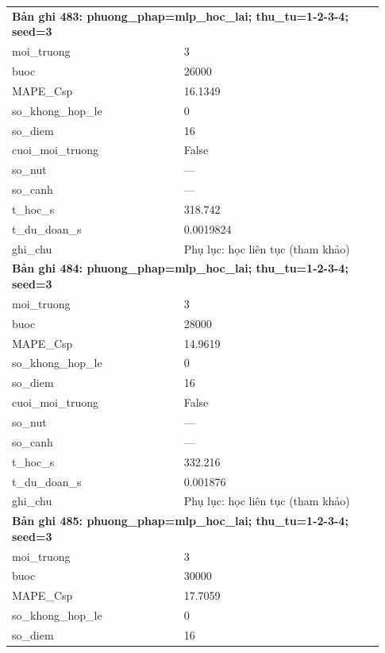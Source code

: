 \begin{longtable}{p{0.43\linewidth}p{0.50\linewidth}}
\midrule
\multicolumn{2}{p{0.95\linewidth}}{\textbf{Bản ghi 483: phuong\_phap=mlp\_hoc\_lai; thu\_tu=1-2-3-4; seed=3}} \\
moi\_\allowbreak truong & 3 \\
buoc & 26000 \\
MAPE\_\allowbreak Csp & 16.1349 \\
so\_\allowbreak khong\_\allowbreak hop\_\allowbreak le & 0 \\
so\_\allowbreak diem & 16 \\
cuoi\_\allowbreak moi\_\allowbreak truong & False \\
so\_\allowbreak nut & — \\
so\_\allowbreak canh & — \\
t\_\allowbreak hoc\_\allowbreak s & 318.742 \\
t\_\allowbreak du\_\allowbreak doan\_\allowbreak s & 0.0019824 \\
ghi\_\allowbreak chu & Phụ lục: học liên tục (tham khảo) \\
\midrule
\multicolumn{2}{p{0.95\linewidth}}{\textbf{Bản ghi 484: phuong\_phap=mlp\_hoc\_lai; thu\_tu=1-2-3-4; seed=3}} \\
moi\_\allowbreak truong & 3 \\
buoc & 28000 \\
MAPE\_\allowbreak Csp & 14.9619 \\
so\_\allowbreak khong\_\allowbreak hop\_\allowbreak le & 0 \\
so\_\allowbreak diem & 16 \\
cuoi\_\allowbreak moi\_\allowbreak truong & False \\
so\_\allowbreak nut & — \\
so\_\allowbreak canh & — \\
t\_\allowbreak hoc\_\allowbreak s & 332.216 \\
t\_\allowbreak du\_\allowbreak doan\_\allowbreak s & 0.001876 \\
ghi\_\allowbreak chu & Phụ lục: học liên tục (tham khảo) \\
\midrule
\multicolumn{2}{p{0.95\linewidth}}{\textbf{Bản ghi 485: phuong\_phap=mlp\_hoc\_lai; thu\_tu=1-2-3-4; seed=3}} \\
moi\_\allowbreak truong & 3 \\
buoc & 30000 \\
MAPE\_\allowbreak Csp & 17.7059 \\
so\_\allowbreak khong\_\allowbreak hop\_\allowbreak le & 0 \\
so\_\allowbreak diem & 16 \\

\end{longtable}

